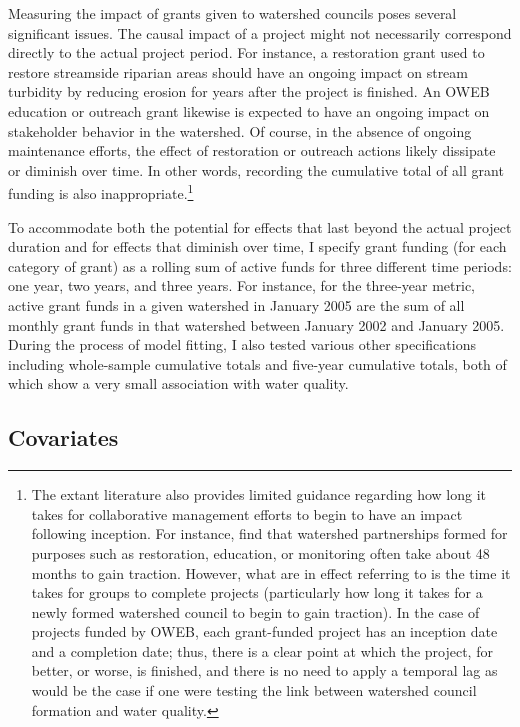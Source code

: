\documentclass[12pt,a4paper,titlepage]{article}
\begin{document}
Measuring the impact of grants given to watershed councils poses several significant issues. The causal impact of a project might not necessarily correspond directly to the actual project period. For instance, a restoration grant used to restore streamside riparian areas should have an ongoing impact on stream turbidity by reducing erosion for years after the project is finished. An OWEB education or outreach grant likewise is expected to have an ongoing impact on stakeholder behavior in the watershed. Of course, in the absence of ongoing maintenance efforts, the effect of restoration or outreach actions likely dissipate or diminish over time. In other words, recording the cumulative total of all grant funding is also inappropriate.\footnote{The extant literature also provides limited guidance regarding how long it takes for collaborative management efforts to begin to have an impact following inception. For instance, \textcite{leach2002} find that watershed partnerships formed for purposes such as restoration, education, or monitoring often take about 48 months to gain traction. However, what \textcite{leach2002} are in effect referring to is the time it takes for groups to complete projects (particularly how long it takes for a newly formed watershed council to begin to gain traction). In the case of projects funded by OWEB, each grant-funded project has an inception date and a completion date; thus, there is a clear point at which the project, for better, or worse, is finished, and there is no need to apply a temporal lag as would be the case if one were testing the link between watershed council formation and water quality.} 

To accommodate both the potential for effects that last beyond the actual project duration and for effects that diminish over time, I specify grant funding (for each category of grant) as a rolling sum of active funds for three different time periods: one year, two years, and three years. For instance, for the three-year metric, active grant funds in a given watershed in January 2005 are the sum of all monthly grant funds in that watershed between January 2002 and January 2005. During the process of model fitting, I also tested various other specifications including whole-sample cumulative totals and five-year cumulative totals, both of which show a very small association with water quality. 



\subsection*{Covariates}
\end{document}
